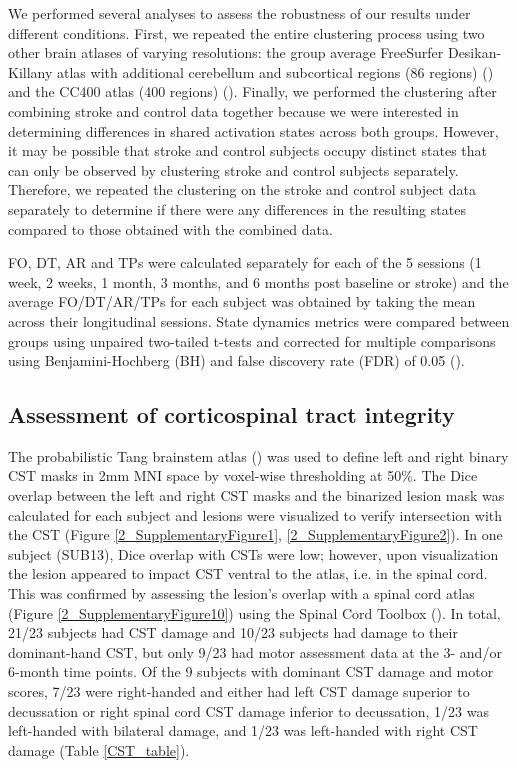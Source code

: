 \documentclass[phd,tocprelim]{cornell}
\begin{document}
	 We performed several analyses to assess the robustness of our results under different conditions. First, we repeated the entire clustering process using two other brain atlases of varying resolutions: the group average FreeSurfer Desikan-Killany atlas with additional cerebellum and subcortical regions (86 regions) (\cite{Desikan2006-vf}) and the CC400 atlas (400 regions) (\cite{Craddock2012-kl}). Finally, we performed the clustering after combining stroke and control data together because we were interested in determining differences in shared activation states across both groups. However, it may be possible that stroke and control subjects occupy distinct states that can only be observed by clustering stroke and control subjects separately. Therefore, we repeated the clustering on the stroke and control subject data separately to determine if there were any differences in the resulting states compared to those obtained with the combined data.

	 
	 FO, DT, AR and TPs were calculated separately for each of the 5 sessions (1 week, 2 weeks, 1 month, 3 months, and 6 months post baseline or stroke) and the average FO/DT/AR/TPs for each subject was obtained by taking the mean across their longitudinal sessions. State dynamics metrics were compared between groups using unpaired two-tailed t-tests and corrected for multiple comparisons using Benjamini-Hochberg (BH) and false discovery rate (FDR) of 0.05 (\cite{Benjamini1995-bb}). 

	 \subsection{Assessment of corticospinal tract integrity}
	 The probabilistic Tang brainstem atlas (\cite{Tang2018-ac}) was used to define left and right binary CST masks in 2mm MNI space by voxel-wise thresholding at 50$\%$. The Dice overlap between the left and right CST masks and the binarized lesion mask was calculated for each subject and lesions were visualized to verify intersection with the CST (Figure \ref{2_SupplementaryFigure1}, \ref{2_SupplementaryFigure2}). In one subject (SUB13), Dice overlap with CSTs were low; however, upon visualization the lesion appeared to impact CST ventral to the atlas, i.e. in the spinal cord. This was confirmed by assessing the lesion's overlap with a spinal cord atlas (Figure \ref{2_SupplementaryFigure10}) using the Spinal Cord Toolbox (\cite{De_Leener2017-ev}). In total, 21/23 subjects had CST damage and 10/23 subjects had damage to their dominant-hand CST, but only 9/23 had motor assessment data at the 3- and/or 6-month time points. Of the 9 subjects with dominant CST damage and motor scores, 7/23 were right-handed and either had left CST damage superior to decussation or right spinal cord CST damage inferior to decussation, 1/23 was left-handed with bilateral damage, and 1/23 was left-handed with right CST damage (Table \ref{CST_table}).
	 
\end{document}
